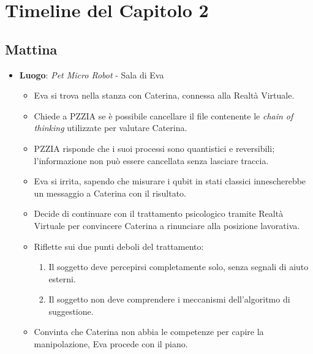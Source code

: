 \section*{Timeline del Capitolo 2}

\subsection*{Mattina}

\begin{itemize}
    \item \textbf{Luogo}: \emph{Pet Micro Robot} - Sala di Eva
    \begin{itemize}
        \item Eva si trova nella stanza con Caterina, connessa alla Realtà Virtuale.
        \item Chiede a PZZIA se è possibile cancellare il file contenente le \emph{chain of thinking} utilizzate per valutare Caterina.
        \item PZZIA risponde che i suoi processi sono quantistici e reversibili; l'informazione non può essere cancellata senza lasciare traccia.
        \item Eva si irrita, sapendo che misurare i qubit in stati classici innescherebbe un messaggio a Caterina con il risultato.
        \item Decide di continuare con il trattamento psicologico tramite Realtà Virtuale per convincere Caterina a rinunciare alla posizione lavorativa.
        \item Riflette sui due punti deboli del trattamento:
        \begin{enumerate}
            \item Il soggetto deve percepirsi completamente solo, senza segnali di aiuto esterni.
            \item Il soggetto non deve comprendere i meccanismi dell'algoritmo di suggestione.
        \end{enumerate}
        \item Convinta che Caterina non abbia le competenze per capire la manipolazione, Eva procede con il piano.
    \end{itemize}


\end{itemize}
